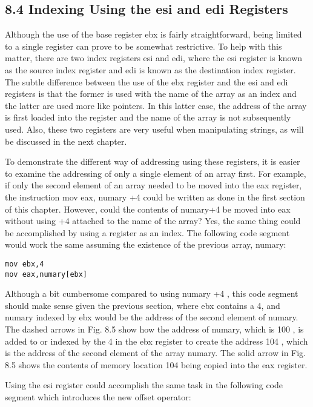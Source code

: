 \documentclass[10pt]{article}
\begin{document}
\subsection*{8.4 Indexing Using the esi and edi Registers}
Although the use of the base register ebx is fairly straightforward, being limited to a single register can prove to be somewhat restrictive. To help with this matter, there are two index registers esi and edi, where the esi register is known as the source index register and edi is known as the destination index register. The subtle difference between the use of the ebx register and the esi and edi registers is that the former is used with the name of the array as an index and the latter are used more like pointers. In this latter case, the address of the array is first loaded into the register and the name of the array is not subsequently used. Also, these two registers are very useful when manipulating strings, as will be discussed in the next chapter.

To demonstrate the different way of addressing using these registers, it is easier to examine the addressing of only a single element of an array first. For example, if only the second element of an array needed to be moved into the eax register, the instruction mov eax, numary +4 could be written as done in the first section of this chapter. However, could the contents of numary+4 be moved into eax without using +4 attached to the name of the array? Yes, the same thing could be accomplished by using a register as an index. The following code segment would work the same assuming the existence of the previous array, numary:

\begin{verbatim}
mov ebx,4
mov eax,numary[ebx]
\end{verbatim}

Although a bit cumbersome compared to using numary +4 , this code segment should make sense given the previous section, where ebx contains a 4, and numary indexed by ebx would be the address of the second element of numary. The dashed arrows in Fig. 8.5 show how the address of numary, which is 100 , is added to or indexed by the 4 in the ebx register to create the address 104 , which is the address of the second element of the array numary. The solid arrow in Fig. 8.5 shows the contents of memory location 104 being copied into the eax register.

Using the esi register could accomplish the same task in the following code segment which introduces the new offset operator:
\end{document}
